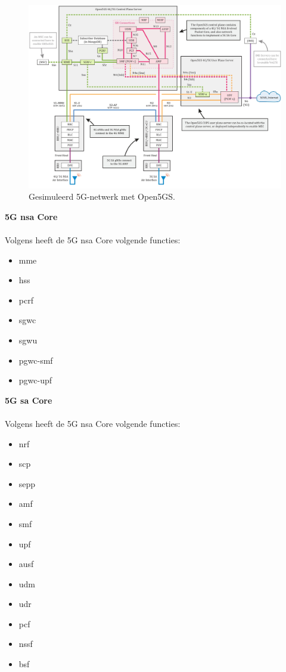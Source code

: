 \begin{figure}[H]
  \includegraphics[width=\linewidth]{../graphics/Open5GS-Schema.jpg}
  \caption{Gesimuleerd 5G-netwerk met Open5GS. \autocite[Door][Copyright 2021 van \citeauthor{Lee2021}]{Lee2021}}
  \label{fig:open5gs-schema}
\end{figure}

\textbf{5G \gls{nsa} Core}\\\\
Volgens \textcite{Lee2025a} heeft de 5G \gls{nsa} Core volgende functies:

\begin{itemize}
  \item \gls{mme}
  \item \gls{hss}
  \item \gls{pcrf}
  \item \gls{sgwc}
  \item \gls{sgwu}
  \item \gls{pgwc-smf}
  \item \gls{pgwc-upf}
\end{itemize}

\textbf{5G \gls{sa} Core}\\\\

Volgens \textcite{Lee2025a} heeft de 5G \gls{nsa} Core volgende functies:

\begin{itemize}
  \item \gls{nrf}
  \item \gls{scp}
  \item \gls{sepp}
  \item \gls{amf}
  \item \gls{smf}
  \item \gls{upf}
  \item \gls{ausf}
  \item \gls{udm}
  \item \gls{udr}
  \item \gls{pcf}
  \item \gls{nssf}
  \item \gls{bsf}
\end{itemize}

